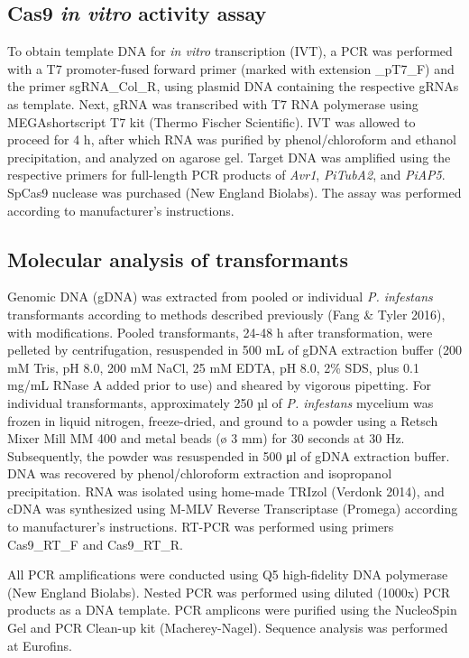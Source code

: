 \documentclass[onecolumn, 11pt,openany]{memoir}
\begin{document}
\begin{multicols}{2}
\begin{footnotesize}
\subsection{Cas9 \textit{in vitro} activity assay}
To obtain template DNA for \textit{in vitro} transcription (IVT), a PCR was performed with a T7 promoter-fused forward primer (marked with extension \_pT7\_F) and the primer sgRNA\_Col\_R, using plasmid DNA containing the respective gRNAs as template. Next, gRNA was transcribed with T7 RNA polymerase using MEGAshortscript T7 kit (Thermo Fischer Scientific). IVT was allowed to proceed for 4 h, after which RNA was purified by phenol/chloroform and ethanol precipitation, and analyzed on agarose gel. Target DNA was amplified using the respective primers for full-length PCR products of \textit{Avr1}, \textit{PiTubA2}, and \textit{PiAP5}. SpCas9 nuclease was purchased (New England Biolabs). The assay was performed according to manufacturer’s instructions.

\subsection{Molecular analysis of transformants}
Genomic DNA (gDNA) was extracted from pooled or individual \textit{P. infestans} transformants according to methods described previously (Fang \& Tyler 2016), with modifications. Pooled transformants, 24-48 h after transformation, were pelleted by centrifugation, resuspended in 500 mL of gDNA extraction buffer (200 mM Tris, pH 8.0, 200 mM NaCl, 25 mM EDTA, pH 8.0, 2\% SDS, plus 0.1 mg/mL RNase A added prior to use) and sheared by vigorous pipetting. For individual transformants, approximately 250 µl of \textit{P. infestans }mycelium was frozen in liquid nitrogen, freeze-dried, and ground to a powder using a Retsch Mixer Mill MM 400 and metal beads (ø 3 mm) for 30 seconds at 30 Hz. Subsequently, the powder was resuspended in 500 μl of gDNA extraction buffer. DNA was recovered by phenol/chloroform extraction and isopropanol precipitation. RNA was isolated using home-made TRIzol (Verdonk 2014), and cDNA was synthesized using M-MLV Reverse Transcriptase (Promega) according to manufacturer’s instructions. RT-PCR was performed using primers Cas9\_RT\_F and Cas9\_RT\_R.

All PCR amplifications were conducted using Q5 high-fidelity DNA polymerase (New England Biolabs). Nested PCR was performed using diluted (1000x) PCR products as a DNA template. PCR amplicons were purified using the NucleoSpin Gel and PCR Clean-up kit (Macherey-Nagel). Sequence analysis was performed at Eurofins. 


\end{footnotesize}
\end{multicols}
\end{document}
